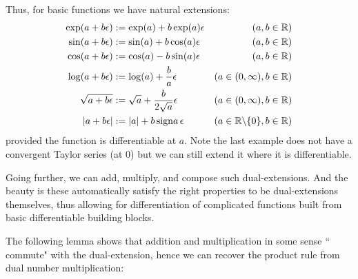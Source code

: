 Thus, for basic functions we have natural extensions:
\begin{align*}
\exp(a + b \epsilon) &:= \exp(a) + b \exp(a) \epsilon & (a,b \in {\mathbb R}) \\
\sin(a + b \epsilon) &:= \sin(a) + b \cos(a) \epsilon & (a,b \in {\mathbb R}) \\
\cos(a + b \epsilon) &:= \cos(a) - b \sin(a) \epsilon & (a,b \in {\mathbb R}) \\
\log(a + b \epsilon) &:= \log(a) + {b \over a} \epsilon & (a \in (0,\infty), b \in {\mathbb R}) \\
\sqrt{a+b \epsilon} &:= \sqrt{a} + {b \over 2 \sqrt{a}} \epsilon & (a \in (0,\infty), b \in {\mathbb R}) \\
|a + b \epsilon| &:= |a| + b\, {\rm sign} a\, \epsilon & (a \in {\mathbb R} \backslash \{0\} , b \in {\mathbb R})
\end{align*}
provided the function is differentiable at $a$. Note the last example does not have a convergent Taylor series (at $0$) but we can still extend it where it is differentiable.

Going further, we can add, multiply, and compose such dual-extensions. And the beauty is these automatically satisfy the right properties to be dual-extensions themselves, thus allowing for differentiation of  complicated functions built from basic differentiable building blocks.

The following lemma shows that addition and multiplication in some sense \ensuremath{\ldq}commute" with the dual-extension, hence we can recover the product rule from dual number multiplication:


